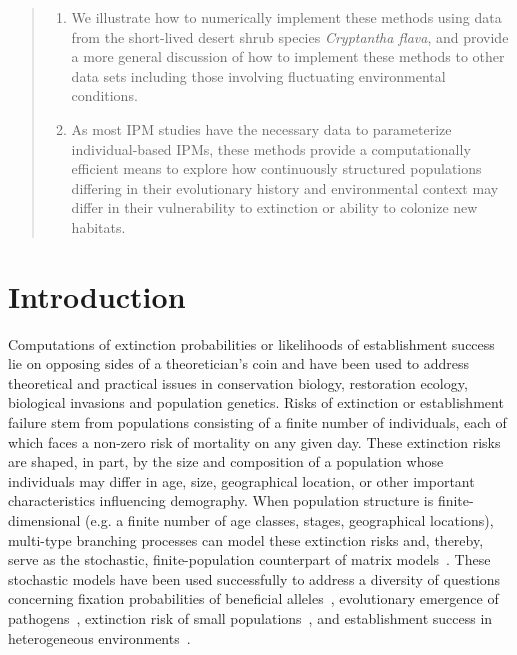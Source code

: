 \documentclass[12pt]{amsart}\usepackage[]{graphicx}\usepackage[]{color}
\begin{document}
\begin{quote}
\begin{enumerate}
\item We illustrate how to numerically implement these methods using data from the short-lived desert shrub species \emph{Cryptantha flava}, and provide a more general discussion of how to implement these methods to other data sets including those involving fluctuating environmental conditions.
\item As most IPM studies have the necessary data to parameterize individual-based IPMs, these methods provide a computationally efficient means to explore how continuously structured populations differing in their evolutionary history and environmental context may differ in their vulnerability to extinction or ability to colonize new habitats.
\end{enumerate}
\end{quote}

\vspace{21pt}




\section*{Introduction}
Computations of extinction probabilities or likelihoods of establishment success lie on opposing sides of a theoretician's coin and have been used to address theoretical and practical issues in conservation biology, restoration ecology, biological invasions and population genetics. Risks of extinction or establishment failure stem from populations consisting of a finite number of individuals, each of which faces a non-zero risk of mortality on any given day. These extinction risks are shaped, in part, by the size and composition of a population whose individuals may differ in age, size, geographical location, or other important characteristics influencing demography. When population structure is finite-dimensional (e.g. a finite number of age classes, stages, geographical locations), multi-type branching processes can model these extinction risks and, thereby, serve as the stochastic, finite-population counterpart of matrix models~\citep{harris-63, athreya-ney-04, caswell-01, haccou-etal-05}. These stochastic models have been used successfully to address a diversity of questions concerning fixation probabilities of beneficial alleles~\citep{patwa-wahl-08}, evolutionary emergence of pathogens~\citep{antia-etal-03, ptrb-13}, extinction risk of small populations~\citep{boyce-92, gosselin-lebreton-00, fujiwara-caswell-01, erickson-etal-15}, and establishment success in heterogeneous environments~\citep{haccou-iwasa-96, haccou-vatunin-03, amnat-09b}.
\end{document}
